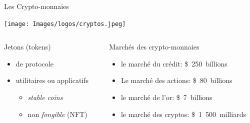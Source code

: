 \documentclass{beamer}
\begin{document}
\begin{frame}[label={sec:orgf65db3b}]{Les Crypto-monnaies}
  \begin{center}
    \texttt{[image: Images/logos/cryptos.jpeg]}
  \end{center}

  \begin{columns}
    \begin{column}{0.43\columnwidth}
      \begin{block}{Jetons (tokens)}
        \begin{itemize}
        \item <1> de protocole
        \item <2> utilitaires ou applicatifs
          \begin{itemize}
          \item \emph{stable coins}
          \item non \emph{fongible} (NFT)
          \end{itemize}
        \end{itemize}
      \end{block}
    \end{column}

    \begin{column}{0.55\columnwidth}
      \begin{block}{Marchés des crypto-monnaies}
        \begin{itemize}
        \item <3> le marché du crédit: \$~250~billions
        \item <3> Le marché des actions: \$~80~billions
        \item <3> le marché de l'or: \$~7~billions
        \item <3> \alert{le marché des cryptos: \$~1~500~milliards}
        \end{itemize}
      \end{block}
    \end{column}
  \end{columns}
\end{frame}
\end{document}
